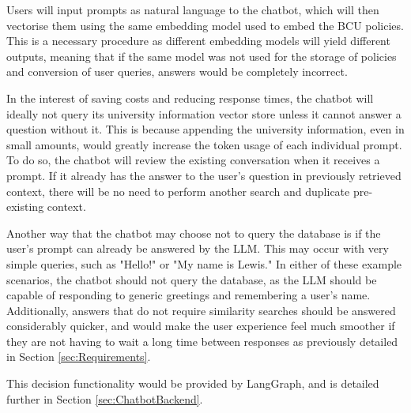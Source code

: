\noindent Users will input prompts as natural language to the chatbot, which will then vectorise them using the same embedding model used 
to embed the BCU policies. This is a necessary procedure as different embedding models will yield different outputs, meaning that if the same 
model was not used for the storage of policies and conversion of user queries, answers would be completely incorrect. 

\pagebreak

\para In the interest of saving costs and reducing response times, the chatbot will ideally not query its university information vector store 
unless it cannot answer a question without it. This is because appending the university information, even in small amounts, would 
greatly increase the token usage of each individual prompt. To do so, the chatbot will review the existing conversation when it receives a 
prompt. If it already has the answer to the user's question in previously retrieved context, there will be no need to perform another search 
and duplicate pre-existing context.

\para Another way that the chatbot may choose not to query the database is if the user's prompt can already be answered by the LLM. This may 
occur with very simple queries, such as "Hello!" or "My name is Lewis." In either of these example scenarios, the chatbot should not query the 
database, as the LLM should be capable of responding to generic greetings and remembering a user's name. Additionally, answers that do not 
require similarity searches should be answered considerably quicker, and would make the user experience feel much smoother if they are not 
having to wait a long time between responses as previously detailed in Section \ref{sec:Requirements}. 

\para This decision functionality would be provided by LangGraph, and is detailed 
further in Section \ref{sec:ChatbotBackend}.




